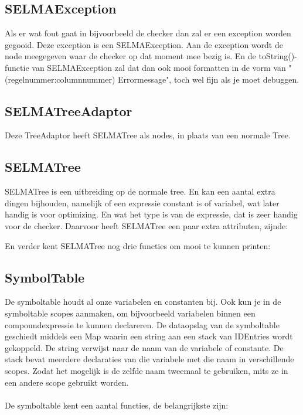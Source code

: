 \documentclass[]{article}
\begin{document}
\subsection{SELMAException}
Als er wat fout gaat in bijvoorbeeld de checker dan zal er een exception worden gegooid. Deze exception is een SELMAException. Aan de exception wordt de node meegegeven waar de checker op dat moment mee bezig is. En de toString()-functie van SELMAException zal dat dan ook mooi formatten in de vorm van "(regelnummer:columnnummer) Errormessage", toch wel fijn als je moet debuggen. 

\subsection{SELMATreeAdaptor}
Deze TreeAdaptor heeft SELMATree als nodes, in plaats van een normale Tree.

\subsection{SELMATree}
SELMATree is een uitbreiding op de normale tree. En kan een aantal extra dingen bijhouden, namelijk of een expressie constant is of variabel, wat later handig is voor optimizing. En wat het type is van de expressie, dat is zeer handig voor de checker.
Daarvoor heeft SELMATree een paar extra attributen, zijnde:

En verder kent SELMATree nog drie functies om mooi te kunnen printen:


\subsection{SymbolTable}
De symboltable houdt al onze variabelen en constanten bij. Ook kun je in de symboltable scopes aanmaken, om bijvoorbeeld variabelen binnen een compoundexpressie te kunnen declareren. De dataopslag van de symboltable geschiedt middels een Map waarin een string aan een stack van IDEntries wordt gekoppeld. De string verwijst naar de naam van de variabele of constante. De stack bevat meerdere declaraties van die variabele met die naam in verschillende scopes. Zodat het mogelijk is de zelfde naam tweemaal te gebruiken, mits ze in een andere scope gebruikt worden.\\
\\
De symboltable kent een aantal functies, de belangrijkste zijn:

\end{document}
